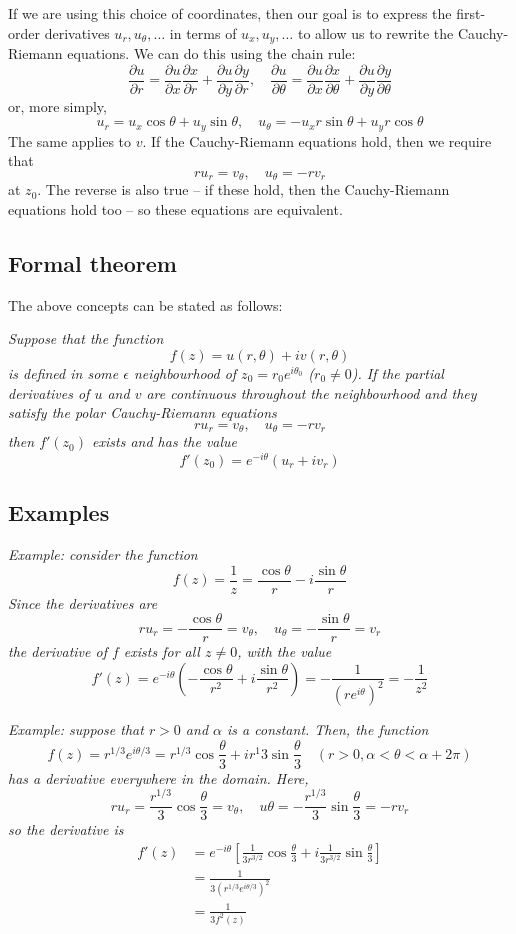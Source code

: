 \documentclass{article}
\begin{document}
If we are using this choice of coordinates, then our goal is to express the first-order derivatives $u_r, u_\theta, \dots$ in terms of $u_x, u_y, \dots$ to allow us to rewrite the Cauchy-Riemann equations. We can do this using the chain rule:
\[
	\frac{\partial u}{\partial r}
	= \frac{\partial u}{\partial x} \frac{\partial x}{\partial r}
	+ \frac{\partial u}{\partial y} \frac{\partial y}{\partial r},	\quad
	\frac{\partial u}{\partial \theta}
	= \frac{\partial u}{\partial x} \frac{\partial x}{\partial \theta}
	+ \frac{\partial u}{\partial y} \frac{\partial y}{\partial \theta}
\]
or, more simply,
\[
	u_r = u_x \cos \theta + u_y \sin \theta,	\quad
	u_\theta = -u_x r \sin \theta + u_y r \cos \theta
\]
The same applies to $v$. If the Cauchy-Riemann equations hold, then we require that
\[
	ru_r = v_\theta,	\quad	u_\theta = -rv_r
\]
at $z_0$. The reverse is also true -- if these hold, then the Cauchy-Riemann equations hold too -- so these equations are equivalent.

\subsection{Formal theorem}
The above concepts can be stated as follows:

\textit{Suppose that the function
\[
	f(z) = u(r, \theta) + iv(r, \theta)
\]
is defined in some $\epsilon$ neighbourhood of $z_0 = r_0 e^{i\theta_0}$ ($r_0 \neq 0$). If the partial derivatives of $u$ and $v$ are continuous throughout the neighbourhood and they satisfy the polar Cauchy-Riemann equations
\[
	ru_r = v_\theta,	\quad u_\theta = -rv_r
\]
then $f'(z_0)$ exists and has the value
\[
	f'(z_0) = e^{-i\theta} (u_r + iv_r)
\]}

\subsection{Examples}
\textit{Example: consider the function
\[
	f(z) = \frac{1}{z} = \frac{\cos \theta}{r} - i\frac{\sin \theta}{r}
\]
Since the derivatives are
\[
	ru_r = -\frac{\cos \theta}{r} = v_\theta,	\quad
	u_\theta = -\frac{\sin \theta}{r} = v_r
\]
the derivative of $f$ exists for all $z \neq 0$, with the value
\[
	f'(z) 
	= e^{-i\theta} \left(-\frac{\cos\theta}{r^2} + i\frac{\sin\theta}{r^2} \right)
	= -\frac{1}{(re^{i\theta})^2} 
	= -\frac{1}{z^2}
\]}

\textit{Example: suppose that $r > 0$ and $\alpha$ is a constant. Then, the function
\[
	f(z) = r^{1/3} e^{i\theta / 3}
	= r^{1/3} \cos \frac{\theta}{3} + i r^{1}{3} \sin \frac{\theta}{3} \quad
	( r > 0, \alpha < \theta < \alpha + 2\pi)
\]
has a derivative everywhere in the domain. Here,
\[
	ru_r = \frac{r^{1/3}}{3} \cos \frac{\theta}{3} = v_\theta,	\quad
	u\theta = -\frac{r^{1/3}}{3} \sin \frac{\theta}{3} = -rv_r
\]
so the derivative is
\begin{align*}
	f'(z) 
	&= e^{-i\theta} \left[ \frac{1}{3r^{3/2}} \cos \frac{\theta}{3} + i \frac{1}{3r^{3/2}} \sin \frac{\theta}{3}\right]	 \\
	&= \frac{1}{3(r^{1/3} e^{i\theta/3})^2} \\
	&= \frac{1}{3 f^2(z)}
\end{align*}
}
\end{document}
